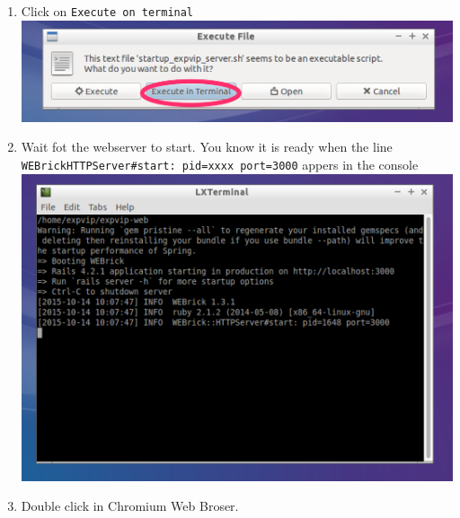 \begin{enumerate}
\item
  Click on \lstinline!Execute on terminal!
  \includegraphics{images/StartupServer02.png}
\item
  Wait fot the webserver to start. You know it is ready when the line
  \lstinline!WEBrickHTTPServer#start: pid=xxxx port=3000! appers in the
  console \includegraphics{images/StartupServer03.png}
\item
  Double click in Chromium Web Broser.

\end{enumerate}

